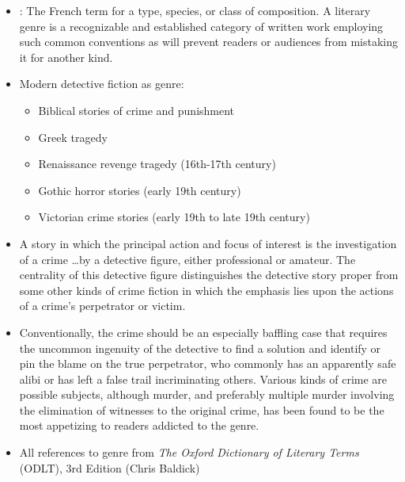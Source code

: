 \documentclass[a4paper,landscape,headrule,footrule,xetex]{foils}
\begin{document}
\makexeCJKinactive
\renewcommand{\avmvalfont}{\it}
\maketitle

%


\begin{itemize}

\item {}: The French term for a type, species, or class of
  composition. A literary genre is a recognizable and established
  category of written work employing such common conventions as will
  prevent readers or audiences from mistaking it for another kind.
  \item Modern detective fiction as genre:
    \begin{itemize}
    \item Biblical stories of  crime and punishment    
  \item Greek tragedy    
  \item Renaissance revenge tragedy (16th-17th   century)    
  \item Gothic horror stories   (early 19th century)    
  \item Victorian crime stories (early 19th to late 19th   century)
  \end{itemize}
\end{itemize}


\begin{itemize}
  \item A story in which the principal action and focus of interest is
    the investigation of a crime \ldots  by a detective figure, either professional or amateur. The centrality of this detective figure distinguishes the detective story proper from some other kinds of crime fiction in which the emphasis lies upon the actions of a crime's perpetrator or victim.      
  \item Conventionally, the crime should be an especially baffling case that requires the uncommon ingenuity of the detective to find a solution and identify or pin the blame on the true perpetrator, who commonly has an apparently safe alibi or has left a false trail incriminating others. Various kinds of crime are possible subjects, although murder, and preferably multiple murder involving the elimination of witnesses to the original crime, has been found to be the most appetizing to readers addicted to the genre.       
  \item All references to genre from   \textit{The Oxford Dictionary of
    Literary Terms} (ODLT), 3rd   Edition (Chris
   Baldick)

  \end{itemize}
\end{document}

